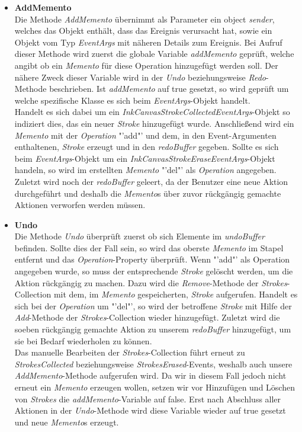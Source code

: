 \begin{itemize}
\item \textbf{AddMemento}\\
Die Methode \textit{AddMemento} übernimmt als Parameter ein object \textit{sender}, welches das Objekt enthält, dass das Ereignis verursacht hat, sowie ein Objekt vom Typ \textit{EventArgs} mit näheren Details zum Ereignis. Bei Aufruf dieser Methode wird zuerst die globale Variable \textit{addMemento} geprüft, welche angibt ob ein \textit{Memento} für diese Operation hinzugefügt werden soll. Der nähere Zweck dieser Variable wird in der \textit{Undo} beziehungsweise \textit{Redo}-Methode beschrieben. Ist \textit{addMemento} auf true gesetzt, so wird geprüft um welche spezifische Klasse es sich beim \textit{EventArgs}-Objekt handelt.\\
Handelt es sich dabei um ein \textit{InkCanvasStrokeCollectedEventArgs}-Objekt so indiziert dies, das ein neuer \textit{Stroke} hinzugefügt wurde. Anschließend wird ein \textit{Memento} mit der \textit{Operation} "'add"' und dem, in den Event-Argumenten enthaltenen, \textit{Stroke} erzeugt und in den \textit{redoBuffer} gegeben. Sollte es sich beim \textit{EventArgs}-Objekt um ein \textit{InkCanvasStrokeEraseEventArgs}-Objekt handeln, so wird im erstellten \textit{Memento} "'del"' als \textit{Operation} angegeben. Zuletzt wird noch der \textit{redoBuffer} geleert, da der Benutzer eine neue Aktion durchgeführt und deshalb die \textit{Memento}s über zuvor rückgängig gemachte Aktionen verworfen werden müssen.
\item \textbf{Undo}\\
Die Methode \textit{Undo} überprüft zuerst ob sich Elemente im \textit{undoBuffer} befinden. Sollte dies der Fall sein, so wird das oberste \textit{Memento} im Stapel entfernt und das \textit{Operation}-Property überprüft. Wenn "'add"' als Operation angegeben wurde, so muss der entsprechende \textit{Stroke} gelöscht werden, um die Aktion rückgängig zu machen. Dazu wird die \textit{Remove}-Methode der \textit{Strokes}-Collection mit dem, im \textit{Memento} gespeicherten, \textit{Stroke} aufgerufen. Handelt es sich bei der \textit{Operation} um "'del"', so wird der betroffene \textit{Stroke} mit Hilfe der \textit{Add}-Methode der \textit{Strokes}-Collection wieder hinzugefügt. Zuletzt wird die soeben rückgängig gemachte Aktion zu unserem \textit{redoBuffer} hinzugefügt, um sie bei Bedarf wiederholen zu können.\\
Das manuelle Bearbeiten der \textit{Strokes}-Collection führt erneut zu \textit{StrokesCollected} beziehungsweise \textit{StrokesErased}-Events, weshalb auch unsere \textit{AddMemento}-Methode aufgerufen wird. Da wir in diesem Fall jedoch nicht erneut ein \textit{Memento} erzeugen wollen, setzen wir vor Hinzufügen und Löschen von \textit{Strokes} die \textit{addMemento}-Variable auf false. Erst nach Abschluss aller Aktionen in der \textit{Undo}-Methode wird diese Variable wieder auf true gesetzt und neue \textit{Memento}s erzeugt. 

\end{itemize}
